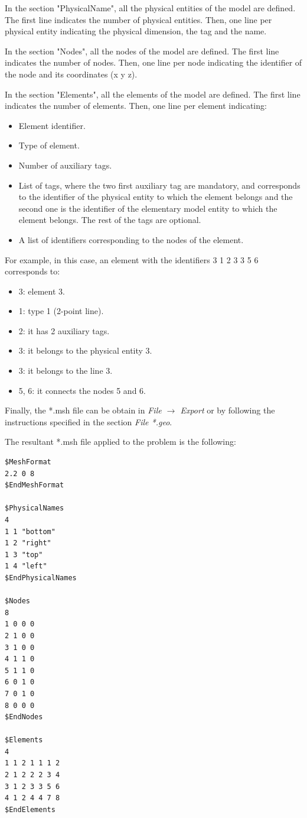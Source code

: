 \documentclass[A4]{article}
\begin{document}
In the section "PhysicalName", all the physical entities of the model are defined. The first line
indicates the number of physical entities. Then, one line per physical entity indicating the physical dimension, the tag and the name.  
   
In the section "Nodes", all the nodes of the model are defined. The first line indicates the number of nodes. Then, one line per node indicating the identifier of the node and its coordinates (x y z).

In the section "Elements", all the elements of the model are defined. The first line indicates the number of elements. Then, one line per element indicating:

\begin{itemize}
	\item Element identifier.
	\item Type of element.
	\item Number of auxiliary tags.
	\item List of tags, where the two first auxiliary tag are mandatory, and corresponds to the identifier of the physical entity to which the element belongs and the second one is the identifier of the elementary model entity to which the element belongs. The rest of the tags are optional.
	\item A list of identifiers corresponding to the nodes of the element.
\end{itemize}

For example, in this case, an element with the identifiers 3 1 2 3 3 5 6 corresponds to:

\begin{itemize}
	\item 3: element 3.
	\item 1: type 1 (2-point line).
	\item 2: it has 2 auxiliary tags.
	\item 3: it belongs to the physical entity 3.
	\item 3: it belongs to the line 3.
	\item 5, 6: it connects the nodes 5 and 6.
\end{itemize} 

Finally, the *.msh file can be obtain in  \textit{File $\to$ Export} or by following the instructions specified in the section \textit{File *.geo}.

The resultant *.msh file applied to the problem is the following:

\begin{Verbatim}
$MeshFormat
2.2 0 8
$EndMeshFormat

$PhysicalNames
4
1 1 "bottom"
1 2 "right"
1 3 "top"
1 4 "left"
$EndPhysicalNames

$Nodes
8
1 0 0 0
2 1 0 0
3 1 0 0
4 1 1 0
5 1 1 0
6 0 1 0
7 0 1 0
8 0 0 0
$EndNodes

$Elements
4
1 1 2 1 1 1 2
2 1 2 2 2 3 4
3 1 2 3 3 5 6
4 1 2 4 4 7 8
$EndElements
\end{Verbatim}
\end{document}
